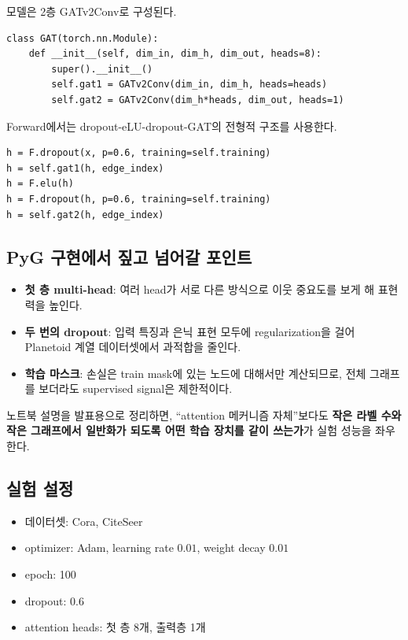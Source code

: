 \documentclass[11pt,a4paper]{article}
\begin{document}
모델은 2층 GATv2Conv로 구성된다.

\begin{lstlisting}
class GAT(torch.nn.Module):
    def __init__(self, dim_in, dim_h, dim_out, heads=8):
        super().__init__()
        self.gat1 = GATv2Conv(dim_in, dim_h, heads=heads)
        self.gat2 = GATv2Conv(dim_h*heads, dim_out, heads=1)
\end{lstlisting}

Forward에서는 dropout-eLU-dropout-GAT의 전형적 구조를 사용한다.

\begin{lstlisting}
h = F.dropout(x, p=0.6, training=self.training)
h = self.gat1(h, edge_index)
h = F.elu(h)
h = F.dropout(h, p=0.6, training=self.training)
h = self.gat2(h, edge_index)
\end{lstlisting}

\subsection*{PyG 구현에서 짚고 넘어갈 포인트}
\begin{itemize}[leftmargin=*]
  \item \textbf{첫 층 multi-head}: 여러 head가 서로 다른 방식으로 이웃 중요도를 보게 해 표현력을 높인다.
  \item \textbf{두 번의 dropout}: 입력 특징과 은닉 표현 모두에 regularization을 걸어 Planetoid 계열 데이터셋에서 과적합을 줄인다.
  \item \textbf{학습 마스크}: 손실은 train mask에 있는 노드에 대해서만 계산되므로, 전체 그래프를 보더라도 supervised signal은 제한적이다.
\end{itemize}

노트북 설명을 발표용으로 정리하면, ``attention 메커니즘 자체''보다도 \textbf{작은 라벨 수와 작은 그래프에서 일반화가 되도록 어떤 학습 장치를 같이 쓰는가}가 실험 성능을 좌우한다.

\subsection*{실험 설정}
\begin{itemize}[leftmargin=*]
  \item 데이터셋: Cora, CiteSeer
  \item optimizer: Adam, learning rate $0.01$, weight decay $0.01$
  \item epoch: 100
  \item dropout: 0.6
  \item attention heads: 첫 층 8개, 출력층 1개
\end{itemize}
\end{document}

